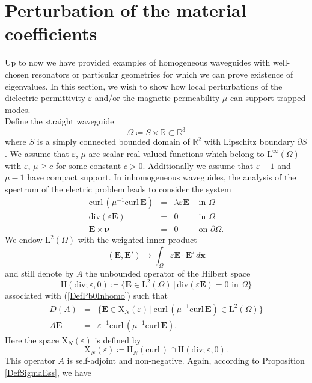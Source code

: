 \documentclass[11pt,a4paper]{article}
\newcommand{\eps}{\varepsilon}
\newcommand{\Om}{\Omega}
\newcommand{\mrm}[1]{\mathrm{#1}}
\newcommand{\bfx}{\boldsymbol{x}}
\newcommand{\bfnu}{\boldsymbol{\nu}}
\newcommand{\R}{\mathbb{R}}
\newcommand{\mL}{\mrm{L}}
\newcommand{\mH}{\mrm{H}}
\newcommand{\mX}{\mrm{X}}
\newcommand{\curlvec}{\boldsymbol{\mrm{curl}}\,}
\renewcommand{\div}{\mrm{div}}
\def\E{\boldsymbol{E}}
\begin{document}
\section{Perturbation of the material coefficients}\label{SectionVariableCoef}

Up to now we have provided examples of homogeneous waveguides with well-chosen resonators or particular geometries for which we can prove existence of eigenvalues.  In this section, we wish to show how local perturbations of the dielectric permittivity $\eps$ and/or the magnetic permeability $\mu$ can support trapped modes.\\
\newline
Define the straight waveguide 
\[
\Om\coloneqq S\times\R\subset\R^3
\]
where $S$ is a simply connected bounded domain of $\R^2$ with Lipschitz boundary $\partial S$. We assume that $\eps$, $\mu$ are scalar real valued functions which belong to $\mL^{\infty}(\Om)$ with $\eps$, $\mu\ge c$ for some constant $c>0$. Additionally we assume that $\eps-1$ and $\mu-1$ have compact support. In inhomogeneous waveguides, the analysis of the spectrum of the electric problem leads to consider the system
\begin{equation}\label{DefPb0Inhomo}
\begin{array}{|rcll}
\curlvec\left(\mu^{-1}\curlvec\E\right)&=&\lambda\eps\E&\mbox{ in }\Om\\[2pt]
\div(\eps\E)&=&0&\mbox{ in }\Om\\[2pt]
\E\times\bfnu&=&0&\mbox{ on }\partial\Om.
\end{array}
\end{equation}
We endow $\boldsymbol{\mL}^2(\Om)$ with the weighted inner product 
\[
(\E,\E')\mapsto\int_{\Om}\eps\E\cdot\E'\,d\bfx
\]
and still denote by $A$ the unbounded operator of the Hilbert space 
\[
\boldsymbol{\mH}(\div;\eps,0)\coloneqq\{\E\in\boldsymbol{\mL}^2(\Om)\,|\,\div(\eps\E)=0\mbox{ in }\Om\}
\]
associated with (\ref{DefPb0Inhomo}) such that 
\[
\begin{array}{|rcl}
D(A)&=&\{\E\in\boldsymbol{\mX}_N(\eps)\,|\,\curlvec(\mu^{-1}\curlvec\E)\in\boldsymbol{\mL}^2(\Om)\}\\[4pt]
A\E&=&\eps^{-1}\curlvec(\mu^{-1}\curlvec\E).
\end{array}
\]
Here the space $\boldsymbol{\mX}_N(\eps)$ is defined by
\[
\boldsymbol{\mX}_N(\eps)\coloneqq\boldsymbol{\mH}_N(\curlvec)\cap \boldsymbol{\mH}(\div;\eps,0).
\]
This operator $A$ is self-adjoint and non-negative. Again, according to Proposition \ref{DefSigmaEss}, we have 
\end{document}
